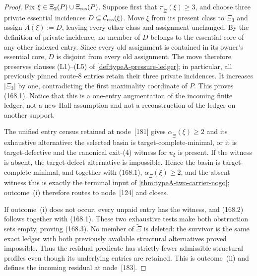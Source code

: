 \documentclass[11pt]{article}
\begin{document}
\begin{proof}
Fix \(\xi\in\Xi_2(P)\cup\Xi_{\rm res}(P)\).  Suppose first that
\(\pi_{\widetilde\Xi}(\xi)\ge3\), and choose three private essential
incidences \(D\subseteq\mathcal C_{\rm ess}(\xi)\).  Move \(\xi\) from its
present class to \(\Xi_3\) and assign \(A(\xi):=D\), leaving every other class
and assignment unchanged.  By the definition of private incidence, no member
of \(D\) belongs to the essential core of any other indexed entry.  Since every
old assignment is contained in its owner's essential core, \(D\) is disjoint
from every old assignment.  The move therefore preserves clauses
\textup{(L1)}--\textup{(L5)} of \cref{def:typeA-pressure-ledger}; in
particular, all previously pinned route-8 entries retain their three private
incidences.  It increases \(|\Xi_3|\) by one, contradicting the first
maximality coordinate of \(P\).  This proves \textup{(168.1)}.  Notice that
this is a one-entry augmentation of the incoming finite ledger, not a new
Hall assumption and not a reconstruction of the ledger on another support.

The unified entry census retained at node~\textup{[181]} gives
\(\alpha_{\widetilde\Xi}(\xi)\ge2\) and its exhaustive alternative: the
selected basin is target-complete-minimal, or it is target-defective and the
canonical exit-\textup{(4)} witness for \(u_\xi\) is present.  If the witness
is absent, the target-defect alternative is impossible.  Hence the basin is
target-complete-minimal, and together with \textup{(168.1)},
\(\alpha_{\widetilde\Xi}(\xi)\ge2\), and the absent witness this is exactly the
terminal input of \cref{thm:typeA-two-carrier-nogo}; outcome~\textup{(i)}
therefore routes to node~\textup{[124]} and closes.

If outcome~\textup{(i)} does not occur, every unpaid entry has the witness,
and \textup{(168.2)} follows together with \textup{(168.1)}.  These two
exhaustive tests make both obstruction sets empty, proving
\textup{(168.3)}.  No member of \(\widetilde\Xi\) is deleted: the survivor is
the same exact ledger with both previously available structural alternatives
proved impossible.  Thus the residual predicate has strictly fewer admissible
structural profiles even though its underlying entries are retained.  This is
outcome~\textup{(ii)} and defines the incoming residual at node~\textup{[183]}.
\end{proof}
\end{document}

